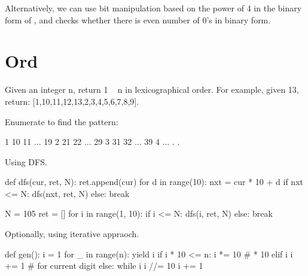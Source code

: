 Alternatively, we can use bit manipulation based on the power of 4 in the binary form of , and checks whether there is even number of 0's in binary form. 

\section{Ord}
 Given an integer n, return 1 ~ n in lexicographical order. For example, given 13, return: [1,10,11,12,13,2,3,4,5,6,7,8,9].

Enumerate to find the pattern:
\begin{python}
1	10	11	...	19
2	21	22	...	29
3	31	32	...	39
4 ...
.
.
\end{python}

Using DFS.
\begin{python}
def dfs(cur, ret, N):
    ret.append(cur)
    for d in range(10):
        nxt = cur * 10 + d
        if nxt <= N:
            dfs(nxt, ret, N)
        else:
            break

N = 105
ret = []
for i in range(1, 10):
    if i <= N:
        dfs(i, ret, N)
    else:
        break
\end{python}

Optionally, using iterative appraoch. 
\begin{python}
def gen():
    i = 1
    for _ in range(n):
        yield i
        if i * 10 <= n:
            i *= 10  # * 10
        elif i %
            i += 1  # for current digit
        else:
            while i %
                i //= 10
            i += 1
\end{python}
